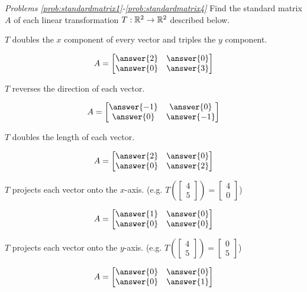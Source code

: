 \documentclass{ximera}
\begin{document}
\emph{Problems \ref{prob:standardmatrix1}-\ref{prob:standardmatrix4}}
Find the standard matrix $A$ of each linear transformation $T:\mathbb{R}^2\rightarrow\mathbb{R}^2$ described below.

  \begin{problem}\label{prob:standardmatrix1}
  $T$ doubles the $x$ component of every vector and triples the $y$ component.
  
  $$A=\begin{bmatrix}\answer{2}&\answer{0}\\\answer{0}&\answer{3}\end{bmatrix}$$
  \end{problem}

  \begin{problem}\label{prob:standardmatrix2}
  $T$ reverses the direction of each vector.
  
  $$A=\begin{bmatrix}\answer{-1}&\answer{0}\\\answer{0}&\answer{-1}\end{bmatrix}$$
  \end{problem}

  \begin{problem}\label{prob:standardmatrix5}
  $T$ doubles the length of each vector.
  
  $$A=\begin{bmatrix}\answer{2}&\answer{0}\\\answer{0}&\answer{2}\end{bmatrix}$$
  \end{problem}

  \begin{problem}\label{prob:standardmatrix3}
  $T$ projects each vector onto the $x$-axis. (e.g. $T\left(\begin{bmatrix}4\\5\end{bmatrix}\right)=\begin{bmatrix}4\\0\end{bmatrix}$)
  
  $$A=\begin{bmatrix}\answer{1}&\answer{0}\\\answer{0}&\answer{0}\end{bmatrix}$$
  \end{problem}

  \begin{problem}\label{prob:standardmatrix4}
  $T$ projects each vector onto the $y$-axis. (e.g. $T\left(\begin{bmatrix}4\\5\end{bmatrix}\right)=\begin{bmatrix}0\\5\end{bmatrix}$)
  
  $$A=\begin{bmatrix}\answer{0}&\answer{0}\\\answer{0}&\answer{1}\end{bmatrix}$$
 \end{problem}
\end{document}
